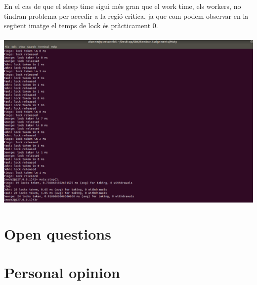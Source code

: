 \documentclass[a4paper, 10pt]{article}
\begin{document}
\begin{enumerate}
En el cas de que el sleep time sigui més gran que el work time, els workers, no tindran problema per accedir a la regió critica, ja que com podem observar en la següent imatge el temps de lock és pràcticament 0.\\\\


\includegraphics[width=\textwidth]{lamp-2}

\end{enumerate}

\newpage
\section{Open questions}
\section{Personal opinion}
\end{document}
